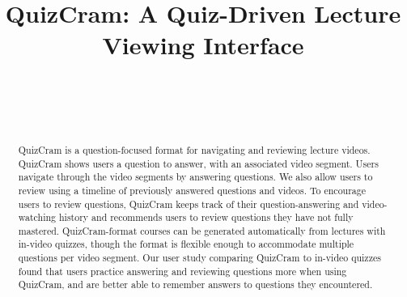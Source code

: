 \documentclass{sigchi}
\begin{document}
\title{QuizCram: A Quiz-Driven Lecture Viewing Interface}

\author{%
  \\
  \\
  \\
}

\maketitle


\begin{abstract}
QuizCram is a question-focused format for navigating and reviewing lecture videos.
QuizCram shows users a question to answer, with an associated video segment.
Users navigate through the video segments by answering questions.
We also allow users to review using a timeline of previously answered questions and videos.
To encourage users to review questions, QuizCram keeps track of their question-answering and video-watching history and recommends users to review questions they have not fully mastered.
QuizCram-format courses can be generated automatically from lectures with in-video quizzes,
though the format is flexible enough to accommodate multiple questions per video segment.
Our user study comparing QuizCram to in-video quizzes found that users
practice answering and reviewing questions more when using QuizCram, and
are better able to remember answers to questions they encountered.
\end{abstract}

\end{document}
